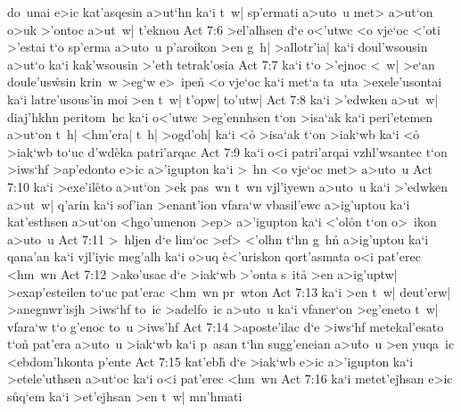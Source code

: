 do~unai
e>ic
kat'asqesin
a>ut`hn
ka`i
t~w|
sp'ermati
a>uto~u
met>
a>ut`on
o>uk
>'ontoc
a>ut~w|
t'eknou\bibvsend
\vs Act 7:6
>el'alhsen
d`e
o<'utwc
<o
vje`oc
<'oti
>'estai
t`o
sp'erma
a>uto~u
p'aroikon
>en
g~h|
>allotr'ia|
ka`i
doul'wsousin
a>ut`o
ka`i
kak'wsousin
>'eth
tetrak'osia\bibvsend
\vs Act 7:7
ka`i
t`o
>'ejnoc
<~w|
>e`an
doule'us\r{w}sin
krin~w
>eg`w
e>~ipen\r{}
<o
vje`oc
ka`i
met`a
ta~uta
>exele'usontai
ka`i
latre'usous'in
moi
>en
t~w|
t'opw|
to'utw|\bibvsend
\vs Act 7:8
ka`i
>'edwken
a>ut~w|
diaj'hkhn
peritom~hc
ka`i
o<'utwc
>eg'ennhsen
t`on
>isa`ak
ka`i
peri'etemen
a>ut`on
t~h|
<hm'era|
t~h|
>ogd'oh|
ka`i
<o\r{}
>isa`ak
t`on
>iak`wb
ka`i
<o\r{}
>iak`wb
to`uc
d'wd\r{e}ka
patri'arqac\bibvsend
\vs Act 7:9
ka`i
o<i
patri'arqai
vzhl'wsantec
t`on
>iws`hf
>ap'edonto
e>ic
a>'igupton
ka`i
>~hn
<o
vje`oc
met>
a>uto~u\bibvsend
\vs Act 7:10
ka`i
>exe'il\r{e}to
a>ut`on
>ek
pas~wn
t~wn
vjl'iyewn
a>uto~u
ka`i
>'edwken
a>ut~w|
q'arin
ka`i
sof'ian
>enant'ion
vfara`w
vbasil'ewc
a>ig'uptou
ka`i
kat'esthsen
a>ut`on
<hgo'umenon
>ep>
a>'igupton
ka`i
<'ol\r{o}n
t`on
o>~ikon
a>uto~u\bibvsend
\vs Act 7:11
>~hljen
d`e
lim`oc
>ef>
<'olhn
t`hn
g~hn\r{}
a>ig'uptou
ka`i
qana'an
ka`i
vjl'iyic
meg'alh
ka`i
o>uq
\r{e}<'uriskon
qort'asmata
o<i
pat'erec
<hm~wn\bibvsend
\vs Act 7:12
>ako'usac
d`e
>iak`wb
>'onta
s~ita\r{}
>en
a>ig'uptw|
>exap'esteilen
to`uc
pat'erac
<hm~wn
pr~wton\bibvsend
\vs Act 7:13
ka`i
>en
t~w|
deut'erw|
>anegnwr'isjh
>iws`hf
to~ic
>adelfo~ic
a>uto~u
ka`i
vfaner`on
>eg'eneto
t~w|
vfara`w
t`o
g'enoc
to~u
>iws'hf\bibvsend
\vs Act 7:14
>aposte'ilac
d`e
>iws`hf
metekal'esato
t`on\r{}
pat'era
a>uto~u
>iak`wb
ka`i
p~asan
t`hn
sugg'eneian
a>u\r{t}o~u
>en
yuqa~ic
<ebdom'hkonta
p'ente\bibvsend
\vs Act 7:15
kat'ebh\r{}
d`e
>iak`wb
e>ic
a>'igupton
ka`i
>etele'uthsen
a>ut`oc
ka`i
o<i
pat'erec
<hm~wn\bibvsend
\vs Act 7:16
ka`i
metet'ejhsan
e>ic
s\r{u}q`em
ka`i
>et'ejhsan
>en
t~w|
mn'hmati
